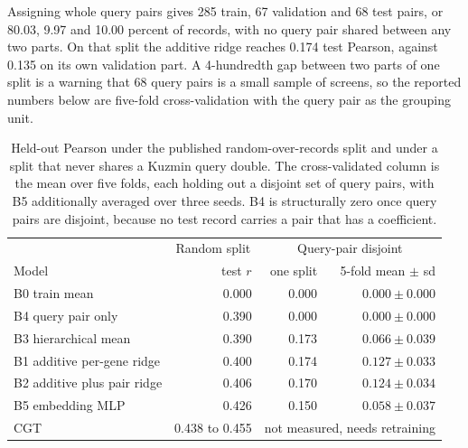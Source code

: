 Assigning whole query pairs gives 285 train, 67 validation and 68 test pairs, or
80.03, 9.97 and 10.00 percent of records, with no query pair shared between any
two parts. On that split the additive ridge reaches 0.174 test Pearson, against
0.135 on its own validation part. A 4-hundredth gap between two parts of one
split is a warning that 68 query pairs is a small sample of screens, so the
reported numbers below are five-fold cross-validation with the query pair as the
grouping unit.

\begin{table}[htbp]
\centering
\begin{tabular}{lrrr}
\hline
& \multicolumn{1}{c}{Random split} & \multicolumn{2}{c}{Query-pair disjoint} \\
Model & test $r$ & one split & 5-fold mean $\pm$ sd \\
\hline
B0 train mean & 0.000 & 0.000 & $0.000 \pm 0.000$ \\
B4 query pair only & 0.390 & 0.000 & $0.000 \pm 0.000$ \\
B3 hierarchical mean & 0.390 & 0.173 & $0.066 \pm 0.039$ \\
B1 additive per-gene ridge & 0.400 & 0.174 & $0.127 \pm 0.033$ \\
B2 additive plus pair ridge & 0.406 & 0.170 & $0.124 \pm 0.034$ \\
B5 embedding MLP & 0.426 & 0.150 & $0.058 \pm 0.037$ \\
CGT & 0.438 to 0.455 & \multicolumn{2}{c}{not measured, needs retraining} \\
\hline
\end{tabular}
\caption{Held-out Pearson under the published random-over-records split and
under a split that never shares a Kuzmin query double. The cross-validated
column is the mean over five folds, each holding out a disjoint set of query
pairs, with B5 additionally averaged over three seeds. B4 is structurally zero
once query pairs are disjoint, because no test record carries a pair that has a
coefficient.}
\label{tab:disjoint}
\end{table}


